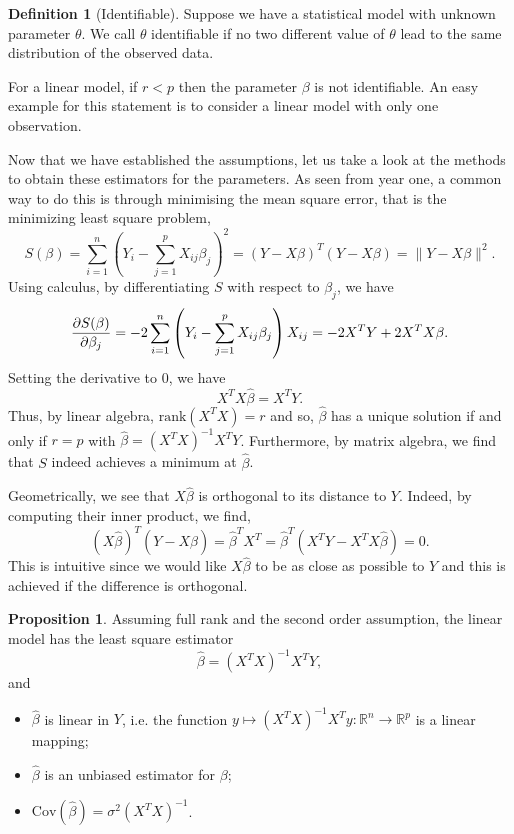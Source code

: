\documentclass[
]{article}
\theoremstyle{definition}
\newtheorem{prop}{Proposition}
\theoremstyle{definition}
\newtheorem{definition}{Definition}[section]
\begin{document}
\begin{definition}[Identifiable]
  Suppose we have a statistical model with unknown parameter \(\theta\). We call 
  \(\theta\) identifiable if no two different value of \(\theta\) lead to the 
  same distribution of the observed data.
\end{definition}

For a linear model, if \(r < p\) then the parameter \(\beta\) is not
identifiable. An easy example for this statement is to consider a linear
model with only one observation.

Now that we have established the assumptions, let us take a look at the
methods to obtain these estimators for the parameters. As seen from year
one, a common way to do this is through minimising the mean square
error, that is the minimizing least square problem,
\[S(\beta) = \sum_{i = 1}^n \left(Y_i - \sum_{j = 1}^p X_{ij} \beta_j\right)^2
  = (Y - X\beta)^T(Y - X\beta) = \|Y - X\beta\|^2.\] Using calculus, by
differentiating \(S\) with respect to \(\beta_j\), we have
\[\pdv{S(\beta)}{\beta_j} = - 2 \sum_{i = 1}^n
  \left(Y_i - \sum_{j = 1}^pX_{ij} \beta_j\right) X_{ij} = -2 X^T Y + 2 X^T X \beta.\]
Setting the derivative to 0, we have \[X^TX \hat{\beta} = X^T Y.\] Thus,
by linear algebra, \(\text{rank}(X^T X) = r\) and so, \(\hat{\beta}\)
has a unique solution if and only if \(r = p\) with
\(\hat \beta = (X^TX)^{-1} X^T Y\). Furthermore, by matrix algebra, we
find that \(S\) indeed achieves a minimum at \(\hat \beta\).

Geometrically, we see that \(X \hat \beta\) is orthogonal to its
distance to \(Y\). Indeed, by computing their inner product, we find,
\[(X\hat \beta)^T (Y - X \hat \beta) = \hat\beta^T X^T = 
  \hat \beta^T (X^T Y - X^T X \hat \beta) = 0.\] This is intuitive since
we would like \(X \hat \beta\) to be as close as possible to \(Y\) and
this is achieved if the difference is orthogonal.

\begin{prop}
  Assuming full rank and the second order assumption, the linear model has 
  the least square estimator 
  \[\hat \beta = (X^T X)^{-1} X^T Y,\]
  and 
  \begin{itemize}
    \item \(\hat \beta\) is linear in \(Y\), i.e. the function 
      \(y \mapsto (X^T X)^{-1} X^T y : \mathbb{R}^n \to \mathbb{R}^p\) is a linear mapping;
    \item \(\hat \beta\) is an unbiased estimator for \(\beta\);
    \item \(\text{Cov}(\hat \beta) = \sigma^2 (X^T X)^{-1}\).
  \end{itemize}
\end{prop}
\proof\hspace{2mm}
\end{document}
